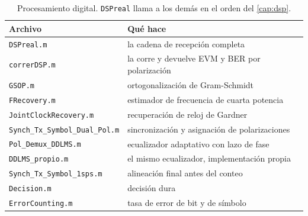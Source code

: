 \begin{table}[htbp]
  \centering
  \small
  \begin{tabular}{ll}
    \toprule
    Archivo & Qu\'e hace \\
    \midrule
    \texttt{DSPreal.m}                   & la cadena de recepci\'on completa \\
    \texttt{correrDSP.m}                 & la corre y devuelve EVM y BER por polarizaci\'on \\
    \midrule
    \texttt{GSOP.m}                      & ortogonalizaci\'on de Gram-Schmidt \\
    \texttt{FRecovery.m}                 & estimador de frecuencia de cuarta potencia \\
    \texttt{JointClockRecovery.m}        & recuperaci\'on de reloj de Gardner \\
    \texttt{Synch\_Tx\_Symbol\_Dual\_Pol.m} & sincronizaci\'on y asignaci\'on de polarizaciones \\
    \texttt{Pol\_Demux\_DDLMS.m}         & ecualizador adaptativo con lazo de fase \\
    \texttt{DDLMS\_propio.m}             & el mismo ecualizador, implementaci\'on propia \\
    \texttt{Synch\_Tx\_Symbol\_1sps.m}   & alineaci\'on final antes del conteo \\
    \texttt{Decision.m}                  & decisi\'on dura \\
    \texttt{ErrorCounting.m}             & tasa de error de bit y de s\'imbolo \\
    \bottomrule
  \end{tabular}
  \caption[Programas del procesamiento digital]{%
    Procesamiento digital. \texttt{DSPreal} llama a los dem\'as en el orden del
    \cref{cap:dsp}.}
  \label{tab:ap-codigos-dsp}
\end{table}

